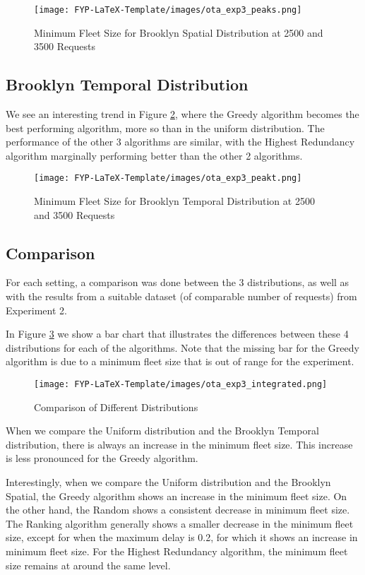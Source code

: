 \documentclass[urop]{socreport}
\begin{document}
\begin{figure}[h]
    \centering
    \texttt{[image: FYP-LaTeX-Template/images/ota\_exp3\_peaks.png]}
    \caption{Minimum Fleet Size for Brooklyn Spatial Distribution at 2500 and 3500 Requests}
    \label{fig:exp3_peaks}
\end{figure}


\subsection{Brooklyn Temporal Distribution}
We see an interesting trend in Figure \ref{fig:exp3_peakt}, where the Greedy algorithm becomes the best performing algorithm, more so than in the uniform distribution. The performance of the other 3 algorithms are similar, with the Highest Redundancy algorithm marginally performing better than the other 2 algorithms.

\begin{figure}[h]
    \centering
    \texttt{[image: FYP-LaTeX-Template/images/ota\_exp3\_peakt.png]}
    \caption{Minimum Fleet Size for Brooklyn Temporal Distribution at 2500 and 3500 Requests}
    \label{fig:exp3_peakt}
\end{figure}

\newpage
\subsection{Comparison}
For each setting, a comparison was done between the 3 distributions, as well as with the results from a suitable dataset (of comparable number of requests) from Experiment 2.

In Figure \ref{fig:exp3_integrated} we show a bar chart that illustrates the differences between these 4 distributions for each of the algorithms. Note that the missing bar for the Greedy algorithm is due to a minimum fleet size that is out of range for the experiment.

\begin{figure}[h]
    \centering
    \texttt{[image: FYP-LaTeX-Template/images/ota\_exp3\_integrated.png]}
    \caption{Comparison of Different Distributions}
    \label{fig:exp3_integrated}
\end{figure}

When we compare the Uniform distribution and the Brooklyn Temporal distribution, there is always an increase in the minimum fleet size. This increase is less pronounced for the Greedy algorithm.

Interestingly, when we compare the Uniform distribution and the Brooklyn Spatial, the Greedy algorithm shows an increase in the minimum fleet size. On the other hand, the Random shows a consistent decrease in minimum fleet size. The Ranking algorithm generally shows a smaller decrease in the minimum fleet size, except for when the maximum delay is 0.2, for which it shows an increase in minimum fleet size. For the Highest Redundancy algorithm, the minimum fleet size remains at around the same level.
\end{document}
